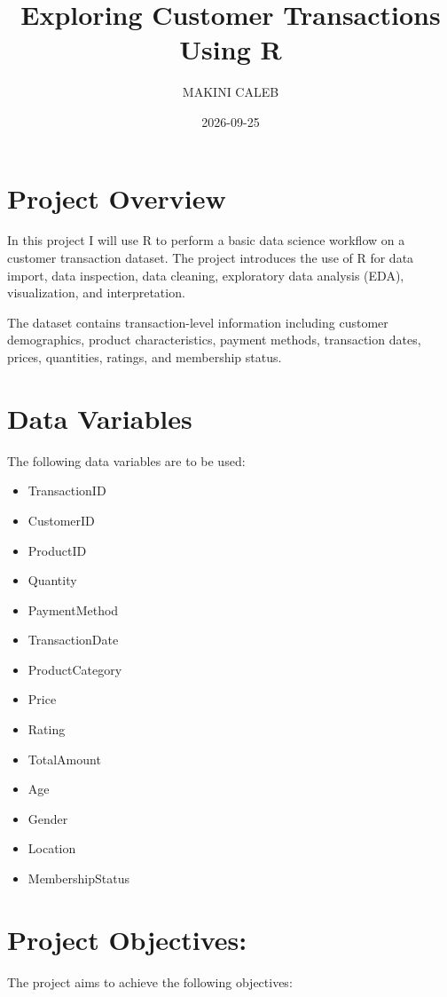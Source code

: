 \documentclass[
]{article}
\title{Exploring Customer Transactions Using R}
\author{MAKINI CALEB}
\date{2026-09-25}
\providecommand{\tightlist}{%
  \setlength{\itemsep}{0pt}\setlength{\parskip}{0pt}}
\begin{document}
\maketitle

\section{Project Overview}\label{project-overview}

In this project I will use R to perform a basic data science workflow on
a customer transaction dataset. The project introduces the use of R for
data import, data inspection, data cleaning, exploratory data analysis
(EDA), visualization, and interpretation.

The dataset contains transaction-level information including customer
demographics, product characteristics, payment methods, transaction
dates, prices, quantities, ratings, and membership status.

\section{Data Variables}\label{data-variables}

The following data variables are to be used:

\begin{itemize}
\tightlist
\item
  TransactionID
\item
  CustomerID
\item
  ProductID
\item
  Quantity
\item
  PaymentMethod
\item
  TransactionDate
\item
  ProductCategory
\item
  Price
\item
  Rating
\item
  TotalAmount
\item
  Age
\item
  Gender
\item
  Location
\item
  MembershipStatus
\end{itemize}

\section{Project Objectives:}\label{project-objectives}

The project aims to achieve the following objectives:
\end{document}
